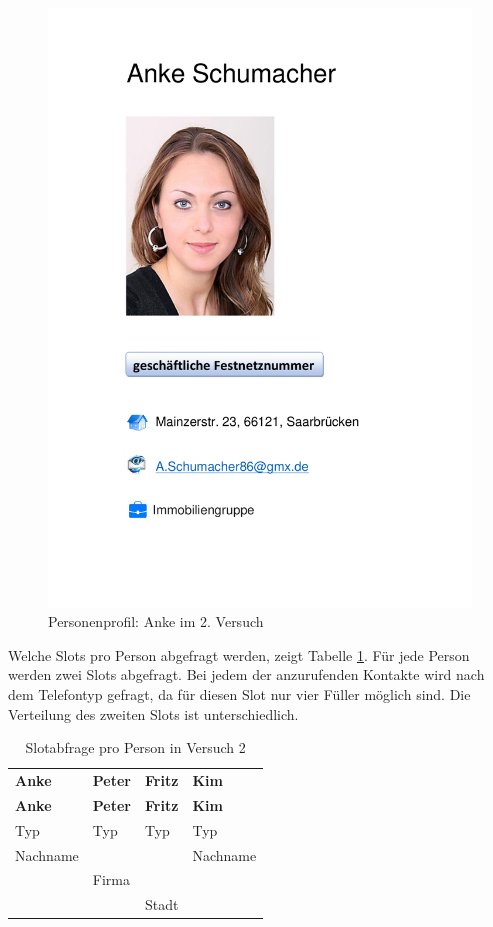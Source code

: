 \documentclass[12pt,a4paper]{scrartcl}
\begin{document}
\begin{figure}[H]
\begin{center}
\includegraphics[width=12cm]{Anke2.pdf}
\caption{Personenprofil: Anke im 2. Versuch}
\label{anke2}
\end{center}
\end{figure}

Welche Slots pro Person abgefragt werden, zeigt Tabelle \ref{slotsPerson2}. 
Für jede Person werden zwei Slots abgefragt. Bei jedem der anzurufenden Kontakte wird nach dem Telefontyp gefragt, da für diesen Slot nur vier Füller möglich sind. Die Verteilung des zweiten Slots ist unterschiedlich.

\begin{longtable}{p{}p{}p{}p{}}
	\label{slotsPerson2}\\
	\caption[Slotabfrage pro Person in Versuch 2]{Slotabfrage pro Person in Versuch 2}\\
	\hline
	\textbf{Anke}&\textbf{Peter}&\textbf{Fritz} &\textbf{Kim}\\
	\hline
	\endfirsthead
	\hline
	\textbf{Anke}&\textbf{Peter}&\textbf{Fritz} &\textbf{Kim}\\
	\hline
	\endhead
Typ & Typ & Typ & Typ\\
Nachname & & & Nachname \\
& Firma & & \\
& & Stadt & \\

\hline
\end{longtable}
\end{document}
